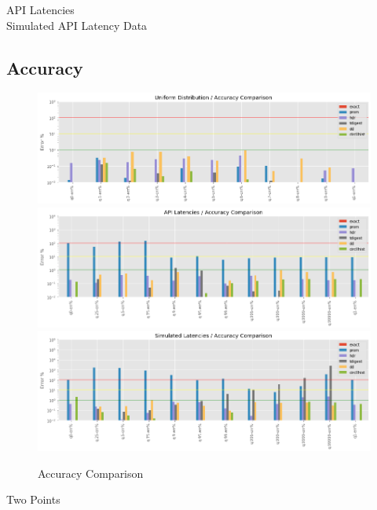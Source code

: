 \documentclass{article}
\theoremstyle{plain}
\theoremstyle{remark}
\begin{document}
API Latencies\\



Simulated API Latency Data\\



\subsection{Accuracy}

\begin{figure}
  \includegraphics[width=\textwidth]{evaluation/images/Uniform_Distribution_accuracy.png}
  \includegraphics[width=\textwidth]{evaluation/images/API_Latencies_accuracy.png}
  \includegraphics[width=\textwidth]{evaluation/images/Simulated_Latencies_accuracy.png}
  \caption{Accuracy Comparison}
\end{figure}


Two Points\\


\end{document}
